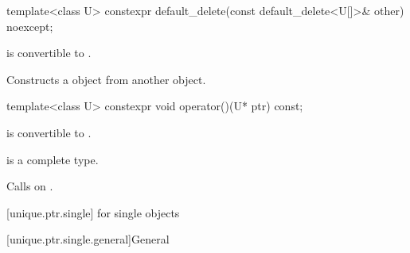 \begin{itemdecl}
template<class U> constexpr default_delete(const default_delete<U[]>& other) noexcept;
\end{itemdecl}

\begin{itemdescr}
\pnum
\constraints
{} is convertible to .

\pnum
\effects
Constructs a  object from another  object.
\end{itemdescr}

%
\begin{itemdecl}
template<class U> constexpr void operator()(U* ptr) const;
\end{itemdecl}

\begin{itemdescr}
\pnum
\constraints
{} is convertible to .

\pnum
\mandates
{} is a complete type.

\pnum
\effects
Calls  on .
\end{itemdescr}

[unique.ptr.single]{ for single objects}

[unique.ptr.single.general]{General}


